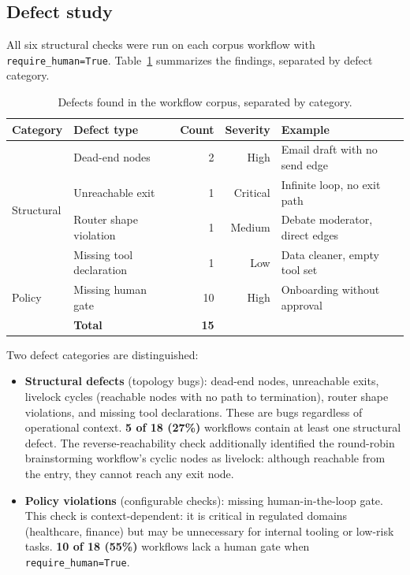 \subsection{Defect study}

All six structural checks were run on each corpus workflow with
\texttt{require\_human=True}. Table~\ref{tab:defects} summarizes the
findings, separated by defect category.

\begin{table}[t]
\centering
\small
\caption{Defects found in the workflow corpus, separated by category.}
\label{tab:defects}
\begin{tabular}{@{}llrrl@{}}
\toprule
\textbf{Category} & \textbf{Defect type} & \textbf{Count} & \textbf{Severity} & \textbf{Example} \\
\midrule
\multirow{4}{*}{Structural} & Dead-end nodes & 2 & High & Email draft with no send edge \\
& Unreachable exit & 1 & Critical & Infinite loop, no exit path \\
& Router shape violation & 1 & Medium & Debate moderator, direct edges \\
& Missing tool declaration & 1 & Low & Data cleaner, empty tool set \\
\midrule
Policy & Missing human gate & 10 & High & Onboarding without approval \\
\midrule
& \textbf{Total} & \textbf{15} & & \\
\bottomrule
\end{tabular}
\end{table}

Two defect categories are distinguished:
\begin{itemize}
  \item \textbf{Structural defects} (topology bugs): dead-end nodes,
  unreachable exits, livelock cycles (reachable nodes with no path to
  termination), router shape violations, and missing tool
  declarations.  These are bugs regardless of operational context.
  \textbf{5 of 18 (27\%)} workflows contain at least one structural
  defect.  The reverse-reachability check additionally identified the
  round-robin brainstorming workflow's cyclic nodes as livelock: although
  reachable from the entry, they cannot reach any exit node.
  \item \textbf{Policy violations} (configurable checks): missing
  human-in-the-loop gate. This check is context-dependent: it is
  critical in regulated domains (healthcare, finance) but may be
  unnecessary for internal tooling or low-risk tasks.
  \textbf{10 of 18 (55\%)} workflows lack a human gate when
  \texttt{require\_human=True}.
\end{itemize}

